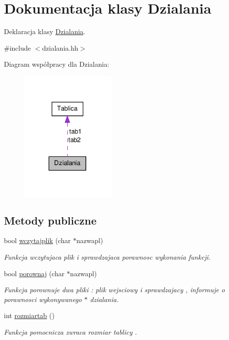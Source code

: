 \hypertarget{class_dzialania}{\section{Dokumentacja klasy Dzialania}
\label{class_dzialania}
}


Deklaracja klasy \hyperlink{class_dzialania}{Dzialania}.  




{\ttfamily \#include $<$dzialania.\-hh$>$}



Diagram współpracy dla Dzialania\-:\nopagebreak
\begin{figure}[H]
\begin{center}
\leavevmode
\includegraphics[width=136pt]{class_dzialania__coll__graph}
\end{center}
\end{figure}
\subsection*{Metody publiczne}
\begin{DoxyCompactItemize}
\item 
bool \hyperlink{class_dzialania_a4d1a1b41a0f2f76d4c16ad20f77b7cfa}{wczytajplik} (char $\ast$nazwapl)
\begin{DoxyCompactList}\small\item\em Funkcja wczytujaca plik i sprawdzajaca porawnosc wykonania funkcji. \end{DoxyCompactList}\item 
bool \hyperlink{class_dzialania_af059b80e034854eb1ae878d6b636fff6}{porownaj} (char $\ast$nazwapl)
\begin{DoxyCompactList}\small\item\em Funkcja porownuje dwa pliki \-: plik wejsciowy i sprawdzajacy , informuje o porawnosci wykonywanego $\ast$ dzialania. \end{DoxyCompactList}\item 
int \hyperlink{class_dzialania_a177e69d16b8280aae1d658adb67a8fbc}{rozmiartab} ()
\begin{DoxyCompactList}\small\item\em Funkcja pomocnicza zwraca rozmiar tablicy . \end{DoxyCompactList}\end{DoxyCompactItemize}
